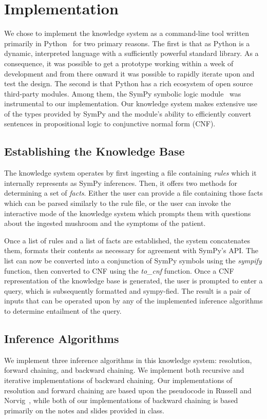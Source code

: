 \documentclass[12pt, conference, compsocconf]{IEEEtran}
\begin{document}
\section{Implementation}
We chose to implement the knowledge system as a command-line tool written primarily in Python~\cite{python-doc} for two primary reasons. 
The first is that as Python is a dynamic, interpreted language with a sufficiently powerful standard library. As a consequence, it was possible to get a prototype working within a week of development and from there onward it was possible to rapidly iterate upon and test the design. 
The second is that Python has a rich ecosystem of open source third-party modules. Among them, the SymPy symbolic logic module~\cite{sympy-doc} was instrumental to our implementation. Our knowledge system makes extensive use of the types provided by SymPy and the module's ability to efficiently convert sentences in propositional logic to conjunctive normal form (CNF).

\subsection{Establishing the Knowledge Base}
The knowledge system operates by first ingesting a file containing \emph{rules} which it internally represents as SymPy inferences. 
Then, it offers two methods for determining a set of \emph{facts}. 
Either the user can provide a file containing those facts which can be parsed similarly to the rule file, or the user can invoke the interactive mode of the knowledge system which prompts them with questions about the ingested mushroom and the symptoms of the patient. 

Once a list of rules and a list of facts are established, the system concatenates them, formats their contents as necessary for agreement with SymPy's API. 
The list can now be converted into a conjunction of SymPy symbols using the \emph{sympify} function, then converted to CNF using the \emph{to\_cnf} function. 
Once a CNF representation of the knowledge base is generated, the user is prompted to enter a query, which is subsequently formatted and sympy-fied. The result is a pair of inputs that can be operated upon by any of the implemented inference algorithms to determine entailment of the query. 

\subsection{Inference Algorithms}
We implement three inference algorithms in this knowledge system: resolution, forward chaining, and backward chaining. 
We implement both recursive and iterative implementations of backward chaining.
Our implementations of resolution and forward chaining are based upon the pseudocode in Russell and Norvig~\cite{russell-norvig-aima}, while both of our implementations of backward chaining is based primarily on the notes and slides provided in class. 
\end{document}
